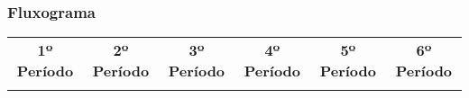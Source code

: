 \begin{landscape}

\subsubsection{Fluxograma}



\begin{table}[h!]
\centering
\tiny
\label{my-label}
\begin{tabular}{lcllcllcllcllcllcl}
\multicolumn{3}{c}{{\bf 1º Período}}                                                                                                                                               & \multicolumn{3}{c}{{\bf 2º Período}}                                                                                                                                                 & \multicolumn{3}{c}{{\bf 3º Período}}                                                                                                                                              & \multicolumn{3}{c}{{\bf 4º Período}}                                                                                                                                       & \multicolumn{3}{c}{{\bf 5º Período}}                                                                                                                                                         & \multicolumn{3}{c}{{\bf 6º Período}}                                                                                                                                                   \\
                          & \multicolumn{1}{l}{}                                                                                                    &                              &                         & \multicolumn{1}{l}{}                                                                                                       &                               &                         & \multicolumn{1}{l}{}                                                                                                    &                               &                         & \multicolumn{1}{l}{}                                                                                             &                               &                         & \multicolumn{1}{l}{}                                                                                                               &                               &                         & \multicolumn{1}{l}{}                                                                                                         &                               \\ \hline

\end{tabular}
\end{table}
\end{landscape}
